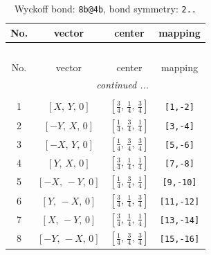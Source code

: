 \documentclass[fleqn,8pt]{jsarticle}
\begin{document}
\begin{longtable}{cccc}
\caption{Wyckoff bond: {\tt 8b@4b}, bond symmetry: {\tt 2..}}
 \\
 \hline \hline
No. & vector & center & mapping \\ \hline \endfirsthead

\multicolumn{3}{l}{\tablename\ \thetable{}} \\
 \hline \hline
No. & vector & center & mapping \\ \hline \endhead

 \hline \hline
\multicolumn{3}{r}{\footnotesize\it continued ...} \\ \endfoot

 \hline \hline
\multicolumn{3}{r}{} \\ \endlastfoot

1 & $\left[ X,\, Y,\, 0 \right]$ & $\left[ \frac{3}{4},\, \frac{1}{4},\, \frac{3}{4} \right]$ & {\tt [1,-2]} \\ \hline
2 & $\left[ - Y,\, X,\, 0 \right]$ & $\left[ \frac{1}{4},\, \frac{3}{4},\, \frac{1}{4} \right]$ & {\tt [3,-4]} \\ \hline
3 & $\left[ - X,\, Y,\, 0 \right]$ & $\left[ \frac{1}{4},\, \frac{3}{4},\, \frac{3}{4} \right]$ & {\tt [5,-6]} \\ \hline
4 & $\left[ Y,\, X,\, 0 \right]$ & $\left[ \frac{3}{4},\, \frac{1}{4},\, \frac{1}{4} \right]$ & {\tt [7,-8]} \\ \hline
5 & $\left[ - X,\, - Y,\, 0 \right]$ & $\left[ \frac{1}{4},\, \frac{3}{4},\, \frac{1}{4} \right]$ & {\tt [9,-10]} \\ \hline
6 & $\left[ Y,\, - X,\, 0 \right]$ & $\left[ \frac{3}{4},\, \frac{1}{4},\, \frac{3}{4} \right]$ & {\tt [11,-12]} \\ \hline
7 & $\left[ X,\, - Y,\, 0 \right]$ & $\left[ \frac{3}{4},\, \frac{1}{4},\, \frac{1}{4} \right]$ & {\tt [13,-14]} \\ \hline
8 & $\left[ - Y,\, - X,\, 0 \right]$ & $\left[ \frac{1}{4},\, \frac{3}{4},\, \frac{3}{4} \right]$ & {\tt [15,-16]} \\
\end{longtable}
\renewcommand{\arraystretch}{1.2}
\end{document}
